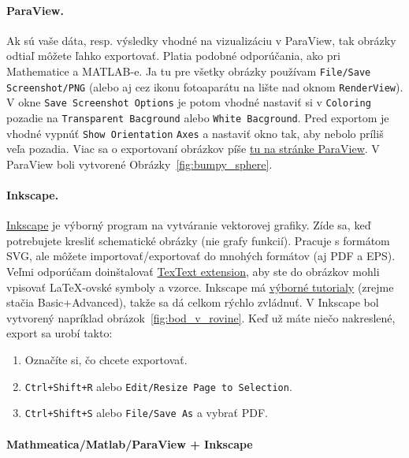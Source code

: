 \paragraph{ParaView.}

Ak sú vaše dáta, resp. výsledky vhodné na vizualizáciu v ParaView, tak obrázky odtiaľ môžete ľahko exportovať. Platia podobné odporúčania, ako pri Mathematice a MATLAB-e. Ja tu pre všetky obrázky používam \verb|File/Save Screenshot/PNG| (alebo aj cez ikonu fotoaparátu na lište nad oknom \verb|RenderView|). V okne \verb|Save Screenshot Options| je potom vhodné nastaviť si v \verb|Coloring| pozadie na \verb|Transparent Bacground| alebo \verb|White Bacground|. Pred exportom je vhodné vypnúť \verb|Show Orientation| \verb|Axes| a nastaviť okno tak, aby nebolo príliš veľa pozadia. 
Viac sa o exportovaní obrázkov píše \href{https://docs.paraview.org/en/v5.8/UsersGuide/savingResults.html}{tu na stránke ParaView}. V ParaView boli vytvorené Obrázky~\ref{fig:bumpy_sphere}.


\paragraph{Inkscape.}

\href{https://inkscape.org/}{Inkscape} je výborný program na vytváranie vektorovej grafiky. Zíde sa, keď potrebujete kresliť schematické obrázky (nie grafy funkcií). Pracuje s formátom SVG, ale môžete importovať/exportovať do mnohých formátov (aj PDF a EPS). Veľmi odporúčam doinštalovať \href{https://inkscape.org/~jcwinkler/%E2%98%85textext}{TexText extension}, aby ste do obrázkov mohli vpisovať LaTeX-ovské symboly a vzorce. Inkscape má \href{https://inkscape.org/learn/}{výborné tutorialy} (zrejme stačia Basic+Advanced), takže sa dá celkom rýchlo zvládnuť. V Inkscape bol vytvorený napríklad obrázok~\ref{fig:bod_v_rovine}. Keď už máte niečo nakreslené, export sa urobí takto:
\begin{enumerate}
	\item Označíte si, čo chcete exportovať.
	\item \verb|Ctrl+Shift+R| alebo \verb|Edit/Resize Page to Selection|.
	\item \verb|Ctrl+Shift+S| alebo \verb|File/Save As| a vybrať PDF. 
\end{enumerate}

\paragraph{Mathmeatica/Matlab/ParaView + Inkscape}

